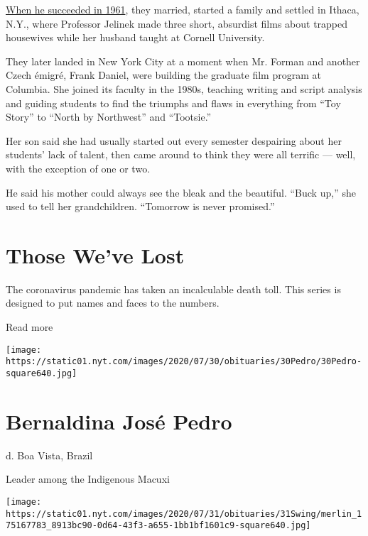 \href{https://www.nytimes.com/1989/12/31/nyregion/czech-couple-keep-eye-on-homeland.html}{When
he succeeded in 1961}, they married, started a family and settled in
Ithaca, N.Y., where Professor Jelinek made three short, absurdist films
about trapped housewives while her husband taught at Cornell University.

They later landed in New York City at a moment when Mr. Forman and
another Czech émigré, Frank Daniel, were building the graduate film
program at Columbia. She joined its faculty in the 1980s, teaching
writing and script analysis and guiding students to find the triumphs
and flaws in everything from ``Toy Story'' to ``North by Northwest'' and
``Tootsie.''

Her son said she had usually started out every semester despairing about
her students' lack of talent, then came around to think they were all
terrific --- well, with the exception of one or two.

He said his mother could always see the bleak and the beautiful. ``Buck
up,'' she used to tell her grandchildren. ``Tomorrow is never
promised.''

\href{https://www.nytimes.com/interactive/2020/obituaries/people-died-coronavirus-obituaries.html?action=click\&pgtype=Article\&state=default\&region=BELOW_MAIN_CONTENT\&context=covid_obits_promo}{}

\hypertarget{those-weve-lost}{%
\section{Those We've Lost}\label{those-weve-lost}}

The coronavirus pandemic has taken an incalculable death toll. This
series is designed to put names and faces to the numbers.

Read more

\texttt{[image: https://static01.nyt.com/images/2020/07/30/obituaries/30Pedro/30Pedro-square640.jpg]}

\hypertarget{bernaldina-josuxe9-pedro}{%
\section{Bernaldina José Pedro}\label{bernaldina-josuxe9-pedro}}

d. Boa Vista, Brazil

Leader among the Indigenous Macuxi

\texttt{[image: https://static01.nyt.com/images/2020/07/31/obituaries/31Swing/merlin\_175167783\_8913bc90-0d64-43f3-a655-1bb1bf1601c9-square640.jpg]}

